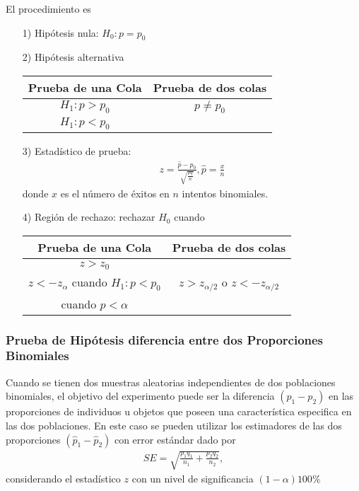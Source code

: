 \documentclass[a4paper]{report} %
\begin{document}
El procedimiento es
\begin{itemize}
\item[1) ] Hip\'otesis nula: $H_{0}:p=p_{0}$
\item[2) ] Hip\'otesis alternativa

\begin{center}
\begin{tabular}{cc}\hline
\textbf{Prueba de una Cola} & \textbf{Prueba de dos colas}\\\hline
$H_{1}:p>p_{0}$ & $p\neq p_{0}$\\
$H_{1}:p<p_{0}$ & \\
\end{tabular}
\end{center}

\item[3) ] Estad\'istico de prueba:
\begin{eqnarray}
z=\frac{\hat{p}-p_{0}}{\sqrt{\frac{pq}{n}}},\hat{p}=\frac{x}{n}
\end{eqnarray}
donde $x$ es el n\'umero de \'exitos en $n$ intentos binomiales.
\item[4) ] Regi\'on de rechazo: rechazar $H_{0}$ cuando
\begin{center}
\begin{tabular}{cc}\hline
\textbf{Prueba de una Cola} & \textbf{Prueba de dos colas}\\\hline
$z>z_{0}$ & \\
$z<-z_{\alpha}$ cuando $H_{1}:p<p_{0}$&$z>z_{\alpha/2}$ o $z<-z_{\alpha/2}$\\
 cuando $p<\alpha$&\\
\end{tabular}
\end{center}
\end{itemize}

\subsubsection{Prueba de Hip\'otesis diferencia entre dos Proporciones Binomiales}

Cuando se tienen dos muestras aleatorias independientes de dos poblaciones binomiales, el objetivo del experimento puede ser la diferencia $\left(p_{1}-p_{2}\right)$ en las proporciones de individuos u objetos que poseen una caracter\'istica especifica en las dos poblaciones. En este caso se pueden utilizar los estimadores de las dos proporciones $\left(\hat{p}_{1}-\hat{p}_{2}\right)$ con error est\'andar dado por
\begin{eqnarray}SE=\sqrt{\frac{p_{1}q_{1}}{n_{1}}+\frac{p_{2}q_{2}}{n_{2}}},\end{eqnarray}
considerando el estad\'istico $z$ con un nivel de significancia $\left(1-\alpha\right)100\%$
\end{document}
